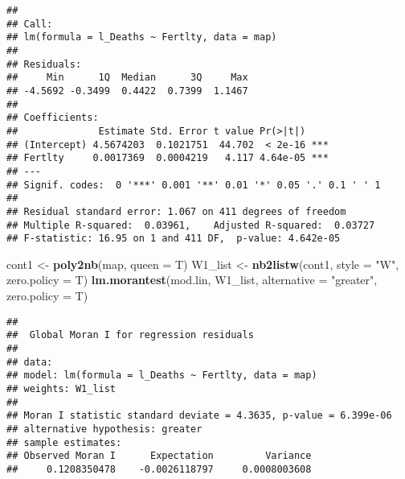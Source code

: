 \documentclass[]{article}
\newenvironment{Shaded}{\begin{snugshade}}{\end{snugshade}}
\newcommand{\KeywordTok}[1]{\textcolor[rgb]{0.13,0.29,0.53}{\textbf{#1}}}
\newcommand{\DataTypeTok}[1]{\textcolor[rgb]{0.13,0.29,0.53}{#1}}
\newcommand{\StringTok}[1]{\textcolor[rgb]{0.31,0.60,0.02}{#1}}
\newcommand{\CommentTok}[1]{\textcolor[rgb]{0.56,0.35,0.01}{\textit{#1}}}
\newcommand{\OperatorTok}[1]{\textcolor[rgb]{0.81,0.36,0.00}{\textbf{#1}}}
\newcommand{\NormalTok}[1]{#1}
\begin{document}
\begin{Shaded}
\end{Shaded}

\begin{verbatim}
## 
## Call:
## lm(formula = l_Deaths ~ Fertlty, data = map)
## 
## Residuals:
##     Min      1Q  Median      3Q     Max 
## -4.5692 -0.3499  0.4422  0.7399  1.1467 
## 
## Coefficients:
##              Estimate Std. Error t value Pr(>|t|)    
## (Intercept) 4.5674203  0.1021751  44.702  < 2e-16 ***
## Fertlty     0.0017369  0.0004219   4.117 4.64e-05 ***
## ---
## Signif. codes:  0 '***' 0.001 '**' 0.01 '*' 0.05 '.' 0.1 ' ' 1
## 
## Residual standard error: 1.067 on 411 degrees of freedom
## Multiple R-squared:  0.03961,    Adjusted R-squared:  0.03727 
## F-statistic: 16.95 on 1 and 411 DF,  p-value: 4.642e-05
\end{verbatim}

\begin{Shaded}
\begin{Highlighting}[]
\NormalTok{cont1 <-}\StringTok{ }\KeywordTok{poly2nb}\NormalTok{(map, }\DataTypeTok{queen =}\NormalTok{ T)}
\NormalTok{W1_list <-}\StringTok{ }\KeywordTok{nb2listw}\NormalTok{(cont1, }\DataTypeTok{style =} \StringTok{"W"}\NormalTok{, }\DataTypeTok{zero.policy =}\NormalTok{ T)}
\KeywordTok{lm.morantest}\NormalTok{(mod.lin, W1_list, }\DataTypeTok{alternative =} \StringTok{"greater"}\NormalTok{, }\DataTypeTok{zero.policy =}\NormalTok{ T)}
\end{Highlighting}
\end{Shaded}

\begin{verbatim}
## 
##  Global Moran I for regression residuals
## 
## data:  
## model: lm(formula = l_Deaths ~ Fertlty, data = map)
## weights: W1_list
## 
## Moran I statistic standard deviate = 4.3635, p-value = 6.399e-06
## alternative hypothesis: greater
## sample estimates:
## Observed Moran I      Expectation         Variance 
##     0.1208350478    -0.0026118797     0.0008003608
\end{verbatim}
\end{document}
